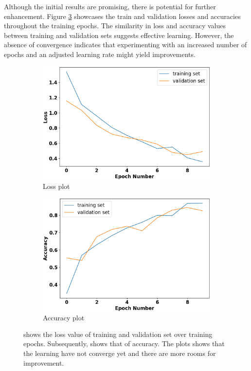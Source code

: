 \documentclass{l4proj}
\begin{document}
Although the initial results are promising, there is potential for further enhancement. Figure \ref{fig:acitivity-initial-loss-and-accuracy-plots} showcases the train and validation losses and accuracies throughout the training epochs. The similarity in loss and accuracy values between training and validation sets suggests effective learning. However, the absence of convergence indicates that experimenting with an increased number of epochs and an adjusted learning rate might yield improvements.
\begin{figure}[h]
   \centering
   \begin{subfigure}{0.4\textwidth}
        \includegraphics[width=\textwidth]{images/activity-initial-test-loss.png}
        \caption{Loss plot}
        \label{fig:activity-initial-test-loss}
    \end{subfigure}
    \qquad
    \begin{subfigure}{0.4\textwidth}
        \includegraphics[width=\textwidth]{images/activity-initial-test-accuracy.png}
        \caption{Accuracy plot}
        \label{fig:activity-initial-test-accuracy}
    \end{subfigure}
  \caption{ shows the loss value of training and validation set over training epochs. Subsequently,  shows that of accuracy. The plots shows that the learning have not converge yet and there are more rooms for improvement.}
  \label{fig:acitivity-initial-loss-and-accuracy-plots}
\end{figure}
\end{document}
